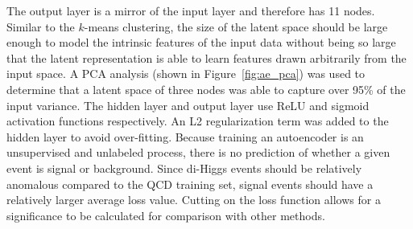 The output layer is a mirror of the input layer and therefore has 11 nodes. Similar to the $k$-means clustering, the size of the latent space should be large enough to model the intrinsic features of the input data without being so large that the latent representation is able to learn features drawn arbitrarily from the input space. A PCA analysis (shown in Figure~\ref{fig:ae_pca}) was used to determine that a latent space of three nodes was able to capture over 95\% of the input variance. The hidden layer and output layer use ReLU and sigmoid activation functions respectively. An L2 regularization term was added to the hidden layer to avoid over-fitting. %
Because training an autoencoder is an unsupervised and unlabeled process, there is no prediction of whether a given event is signal or background. Since di-Higgs events should be relatively anomalous compared to the QCD training set, signal events should have a relatively larger average loss value. Cutting on the loss function allows for a significance to be calculated for comparison with other methods.

